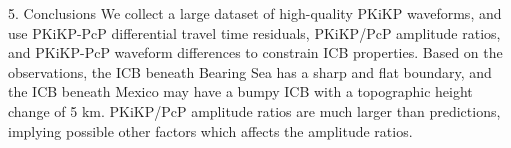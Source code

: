 \documentclass[
    landscape,      %
    paperwidth = 1200mm,
    paperheight = 900mm,
    fontscale = 0.34,
    margin = 1.7cm,
]{baposter}
\begin{document}
\begin{poster}
\begin{posterbox}[column=2, below=auto]{5. Conclusions}
We collect a large dataset of high-quality PKiKP waveforms, and use
PKiKP-PcP differential travel time residuals, PKiKP/PcP amplitude ratios,
and PKiKP-PcP waveform differences to constrain ICB properties.
Based on the observations, the ICB beneath Bearing Sea has a sharp and flat
boundary, and the ICB beneath Mexico may have a bumpy ICB with a topographic
height change of 5 km. PKiKP/PcP amplitude ratios are much larger than predictions,
implying possible other factors which affects the amplitude ratios.
\end{posterbox}

\end{poster}
\end{document}
